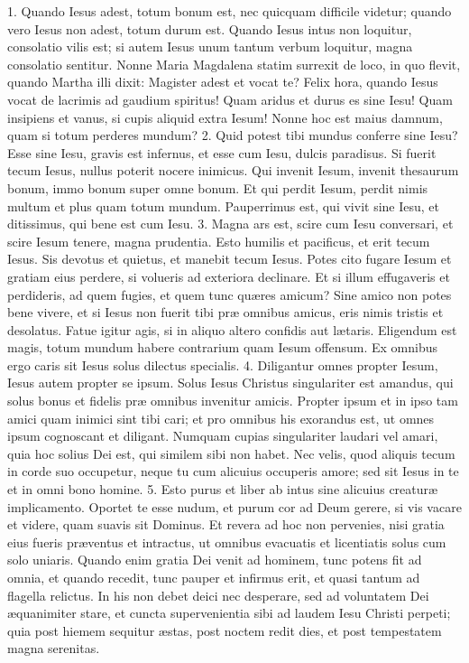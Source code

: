 \documentclass[twoside]{article}
\begin{document}
1. Quando Iesus adest, totum bonum est, nec quicquam difficile videtur; quando vero Iesus non adest, totum durum est. Quando Iesus intus non loquitur, consolatio vilis est; si autem Iesus unum tantum verbum loquitur, magna consolatio sentitur. Nonne Maria Magdalena statim surrexit de loco, in quo flevit, quando Martha illi dixit: Magister adest et vocat te? Felix hora, quando Iesus vocat de lacrimis ad gaudium spiritus! Quam aridus et durus es sine Iesu! Quam insipiens et vanus, si cupis aliquid extra Iesum! Nonne hoc est maius damnum, quam si totum perderes mundum?
2. Quid potest tibi mundus conferre sine Iesu? Esse sine Iesu, gravis est infernus, et esse cum Iesu, dulcis paradisus. Si fuerit tecum Iesus, nullus poterit nocere inimicus. Qui invenit Iesum, invenit thesaurum bonum, immo bonum super omne bonum. Et qui perdit Iesum, perdit nimis multum et plus quam totum mundum. Pauperrimus est, qui vivit sine Iesu, et ditissimus, qui bene est cum Iesu.
3. Magna ars est, scire cum Iesu conversari, et scire Iesum tenere, magna prudentia. Esto humilis et pacificus, et erit tecum Iesus. Sis devotus et quietus, et manebit tecum Iesus. Potes cito fugare Iesum et gratiam eius perdere, si volueris ad exteriora declinare. Et si illum effugaveris et perdideris, ad quem fugies, et quem tunc quæres amicum? Sine amico non potes bene vivere, et si Iesus non fuerit tibi præ omnibus amicus, eris nimis tristis et desolatus. Fatue igitur agis, si in aliquo altero confidis aut lætaris. Eligendum est magis, totum mundum habere contrarium quam Iesum offensum. Ex omnibus ergo caris sit Iesus solus dilectus specialis.
4. Diligantur omnes propter Iesum, Iesus autem propter se ipsum. Solus Iesus Christus singulariter est amandus, qui solus bonus et fidelis præ omnibus invenitur amicis. Propter ipsum et in ipso tam amici quam inimici sint tibi cari; et pro omnibus his exorandus est, ut omnes ipsum cognoscant et diligant. Numquam cupias singulariter laudari vel amari, quia hoc solius Dei est, qui similem sibi non habet. Nec velis, quod aliquis tecum in corde suo occupetur, neque tu cum alicuius occuperis amore; sed sit Iesus in te et in omni bono homine.
5. Esto purus et liber ab intus sine alicuius creaturæ implicamento. Oportet te esse nudum, et purum cor ad Deum gerere, si vis vacare et videre, quam suavis sit Dominus. Et revera ad hoc non pervenies, nisi gratia eius fueris præventus et intractus, ut omnibus evacuatis et licentiatis solus cum solo uniaris. Quando enim gratia Dei venit ad hominem, tunc potens fit ad omnia, et quando recedit, tunc pauper et infirmus erit, et quasi tantum ad flagella relictus. In his non debet deici nec desperare, sed ad voluntatem Dei æquanimiter stare, et cuncta supervenientia sibi ad laudem Iesu Christi perpeti; quia post hiemem sequitur æstas, post noctem redit dies, et post tempestatem magna serenitas.
\end{document}
